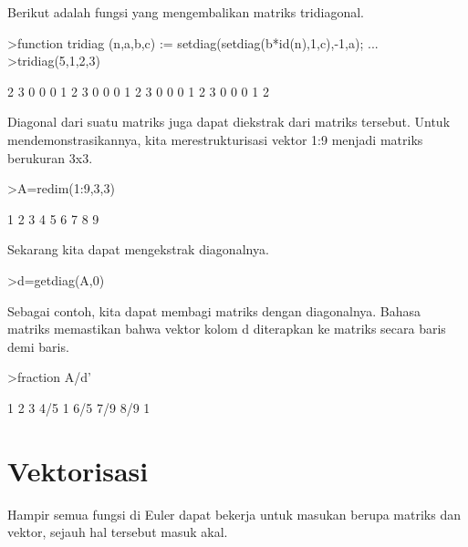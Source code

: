 \documentclass{article}
\newenvironment{eulernotebook}{\par}{\par}
\newcommand{\eulerheading}[1]{\section{#1}}
\newenvironment{eulercomment}{\par\medskip}{\par\medskip}
\begin{document}
\begin{eulernotebook}
\begin{eulercomment}
\begin{eulercomment}
\begin{eulercomment}
\begin{eulercomment}
\begin{eulercomment}
\begin{eulercomment}
\begin{eulercomment}
Berikut adalah fungsi yang mengembalikan matriks tridiagonal.
\end{eulercomment}
\begin{eulerprompt}
>function tridiag (n,a,b,c) := setdiag(setdiag(b*id(n),1,c),-1,a); ...
>tridiag(5,1,2,3)
\end{eulerprompt}
\begin{euleroutput}
              2             3             0             0             0 
              1             2             3             0             0 
              0             1             2             3             0 
              0             0             1             2             3 
              0             0             0             1             2 
\end{euleroutput}
\begin{eulercomment}
Diagonal dari suatu matriks juga dapat diekstrak dari matriks
tersebut. Untuk mendemonstrasikannya, kita merestrukturisasi vektor
1:9 menjadi matriks berukuran 3x3.
\end{eulercomment}
\begin{eulerprompt}
>A=redim(1:9,3,3)
\end{eulerprompt}
\begin{euleroutput}
              1             2             3 
              4             5             6 
              7             8             9 
\end{euleroutput}
\begin{eulercomment}
Sekarang kita dapat mengekstrak diagonalnya.
\end{eulercomment}
\begin{eulerprompt}
>d=getdiag(A,0)
\end{eulerprompt}
\begin{euleroutput}
  [1,  5,  9]
\end{euleroutput}
\begin{eulercomment}
Sebagai contoh, kita dapat membagi matriks dengan diagonalnya. Bahasa
matriks memastikan bahwa vektor kolom d diterapkan ke matriks secara
baris demi baris.
\end{eulercomment}
\begin{eulerprompt}
>fraction A/d'
\end{eulerprompt}
\begin{euleroutput}
          1         2         3 
        4/5         1       6/5 
        7/9       8/9         1 
\end{euleroutput}
\eulerheading{Vektorisasi}
\begin{eulercomment}
Hampir semua fungsi di Euler dapat bekerja untuk masukan berupa
matriks dan vektor, sejauh hal tersebut masuk akal.


\end{eulercomment}
\end{eulercomment}
\end{eulercomment}
\end{eulercomment}
\end{eulercomment}
\end{eulercomment}
\end{eulercomment}
\end{eulernotebook}
\end{document}
